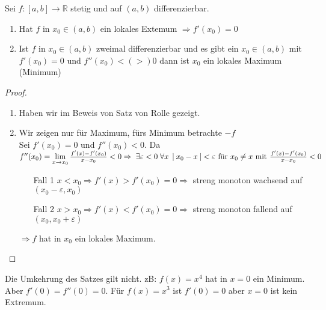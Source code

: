 \documentclass[a4paper,titlepage,oneside]{article}
\def\R{\ensuremath{\mathbb{R}} }
\renewcommand{\epsilon}{\ensuremath{\varepsilon} }
\def\sp{\hspace{0,1cm}}
\newcommand{\limAB}[3][x]{\ensuremath{\lim\limits_{#1 \rightarrow #2}{#3}}}
\newcommand{\limA}[2][x_0]{\limAB{#1}{#2}}
\newcommand{\abs}[1]{\ensuremath{\left|\:#1\:\right|}}
\theoremstyle{thmstyle}
\begin{document}
\begin{satz}
Sei $f : [a,b] \to \R $ stetig und auf $(a,b)$ differenzierbar.
\begin{enumerate}
\item Hat $f$ in $x_0 \in (a,b) $ ein lokales Extemum $ \Rightarrow f'(x_0) = 0$
\item Ist $f$ in $x_0 \in (a,b) $ zweimal differenzierbar und es gibt ein $x_0 \in (a,b)$ mit $f'(x_0) = 0$ und $f''(x_0) <(>) 0$ dann ist $x_0$ ein lokales Maximum (Minimum)
\end{enumerate}
\begin{proof}
\begin{enumerate}
\item Haben wir im Beweis von Satz von Rolle gezeigt.
\item Wir zeigen nur für Maximum, fürs Minimum betrachte $-f$\\
Sei $f'(x_0) = 0$ und $f''(x_0) < 0$. Da $f''(x_0) = \limA{\frac{f'(x) - f'(x_0)}{x - x_0}} < 0 \Rightarrow \sp \exists \epsilon < 0 \sp \forall x \sp \abs{x_0 - x} < \epsilon \text{ für } x_0 \ne x \text{ mit } \frac{f'(x) - f'(x_0)}{x - x_0} < 0$ 
\begin{enumerate}
\item[Fall 1] $x < x_0 \Rightarrow f'(x) > f'(x_0) = 0 \Rightarrow $ streng monoton wachsend auf $(x_0 - \epsilon, x_0)$
\item[Fall 2] $x > x_0 \Rightarrow f'(x) < f'(x_0) = 0  \Rightarrow $ streng monoton fallend auf $(x_0, x_0 + \epsilon)$
\end{enumerate}
$\Rightarrow f$ hat in $x_0$ ein lokales Maximum.
\end{enumerate}
\end{proof}
\end{satz}

\begin{bem}
Die Umkehrung des Satzes gilt nicht. 
zB: $f(x) = x^4$ hat in $x = 0$ ein Minimum. Aber $f'(0) = f''(0) = 0$. Für $f(x) = x^3$ ist $f'(0) = 0$ aber $ x = 0$ ist kein Extremum.\\
\end{bem}
\end{document}
